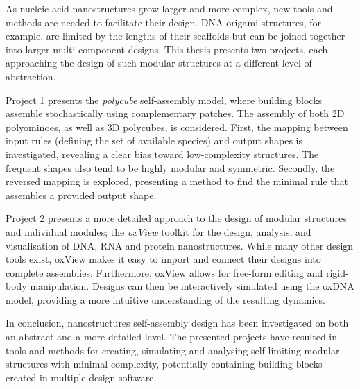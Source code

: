 
As nucleic acid nanostructures grow larger and more complex, new tools and methods are needed to facilitate their design. DNA origami structures, for example, are limited by the lengths of their scaffolds but can be joined together into larger multi-component designs. This thesis presents two projects, each approaching the design of such modular structures at a different level of abstraction.

Project 1 presents the \emph{polycube} self-assembly model, where building blocks assemble stochastically using complementary patches. The assembly of both 2D polyominoes, as well as 3D polycubes, is considered. First, the mapping between input rules (defining the set of available species) and output shapes is investigated, revealing a clear bias toward low-complexity structures. The frequent shapes also tend to be highly modular and symmetric. Secondly, the reversed mapping is explored, presenting a method to find the minimal rule that assembles a provided output shape.

Project 2 presents a more detailed approach to the design of modular structures and individual modules; the \emph{oxView} toolkit for the design, analysis, and visualisation of DNA, RNA and protein nanostructures. While many other design tools exist, oxView makes it easy to import and connect their designs into complete assemblies. Furthermore, oxView allows for free-form editing and rigid-body manipulation. Designs can then be interactively simulated using the oxDNA model, providing a more intuitive understanding of the resulting dynamics.

In conclusion, nanostructures self-assembly design has been investigated on both an abstract and a more detailed level. The presented projects have resulted in tools and methods for creating, simulating and analysing self-limiting modular structures with minimal complexity, potentially containing building blocks created in multiple design software.